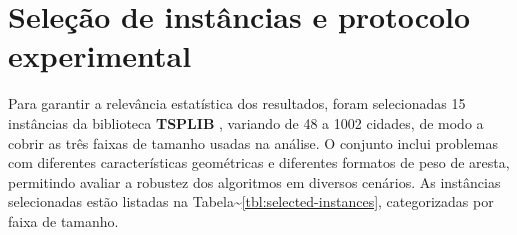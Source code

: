 \section{Seleção de instâncias e protocolo experimental}\label{sec-33-selecao-instancias}

Para garantir a relevância estatística dos resultados, foram selecionadas 15 instâncias da biblioteca \textbf{TSPLIB} \autocite{reinelt1991tsplib}, variando de 48 a 1002 cidades, de modo a cobrir as três faixas de tamanho usadas na análise.
O conjunto inclui problemas com diferentes características geométricas e diferentes formatos de peso de aresta, permitindo avaliar a robustez dos algoritmos em diversos cenários.
As instâncias selecionadas estão listadas na Tabela\textasciitilde{}\ref{tbl:selected-instances}, categorizadas por faixa de tamanho.

